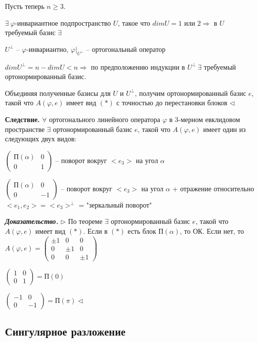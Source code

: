 Пусть теперь $n \geqslant 3$.

$\exists \ \varphi$-инвариантное подпространство $U$, такое что $dimU = 1$ или $2 \Rightarrow$ в $U$ требуемый базис $\exists$

$U^{\bot}$ -- $\varphi$-инвариантно, $\varphi|_{U^{\bot}}$ -- ортогональный оператор

$dimU^{\bot} = n - dimU < n \Rightarrow$ по предположению индукции в $U^{\bot} \ \exists$ требуемый ортонормированный базис.

Объединяя полученные базисы для $U$ и $U^{\bot}$, получим ортонормированный базис $e$, такой что $A(\varphi, e)$ имеет вид $(*)$ с точностью до перестановки блоков $\lhd$

\bigskip
\textbf{Следствие.} $\forall$ ортогонального линейного оператора $\varphi$ в 3-мерном евклидовом пространстве $\exists$ ортонормированный базис $e$, такой что $A(\varphi, e)$ имеет один из следующих двух видов:

 $\begin{pmatrix} П(\alpha) & 0 \\ 0 & 1 \end{pmatrix}$ -- поворот вокруг $<e_3>$ на угол $\alpha$

 $\begin{pmatrix} П(\alpha) & 0 \\ 0 & -1 \end{pmatrix}$ -- поворот вокруг $<e_3>$ на угол $\alpha$ + отражение относительно $<e_1, e_2> = <e_3>^{\bot}$ = "зеркальный поворот"

\bigskip
\textbf{\textit{Доказательство.}} $\rhd$ По теореме $\exists$ ортонормированный базис $e$, такой что $A(\varphi, e)$ имеет вид $(*)$. Если в $(*)$ есть блок $П(\alpha)$, то ОК. Если нет, то $A(\varphi, e) = \begin{pmatrix} \pm 1 & 0 & 0 \\ 0 & \pm 1 & 0 \\ 0 & 0 & \pm 1 \end{pmatrix}$

$\begin{pmatrix} 1 & 0 \\ 0 & 1 \end{pmatrix} = П(0)$

$\begin{pmatrix} -1 & 0 \\ 0 & -1 \end{pmatrix} = П(\pi) \lhd$

\subsection{Сингулярное разложение}

